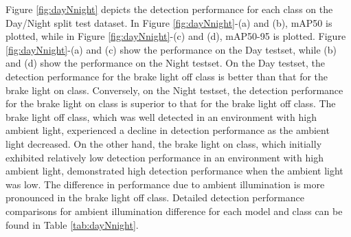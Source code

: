 Figure \ref{fig:dayNnight} depicts the detection performance for each class on the Day/Night split test dataset. 
In Figure \ref{fig:dayNnight}-(a) and (b), mAP50 is plotted, while in Figure \ref{fig:dayNnight}-(c) and (d), mAP50-95 is plotted.
Figure \ref{fig:dayNnight}-(a) and (c) show the performance on the Day testset, while (b) and (d) show the performance on the Night testset.
On the Day testset, the detection performance for the brake light off class is better than that for the brake light on class.
Conversely, on the Night testset, the detection performance for the brake light on class is superior to that for the brake light off class.
The brake light off class, which was well detected in an environment with high ambient light, experienced a decline in detection performance as the ambient light decreased.
On the other hand, the brake light on class, which initially exhibited relatively low detection performance in an environment with high ambient light, demonstrated high detection performance when the ambient light was low.
The difference in performance due to ambient illumination is more pronounced in the brake light off class.
Detailed detection performance comparisons for ambient illumination difference for each model and class can be found in Table \ref{tab:dayNnight}.


